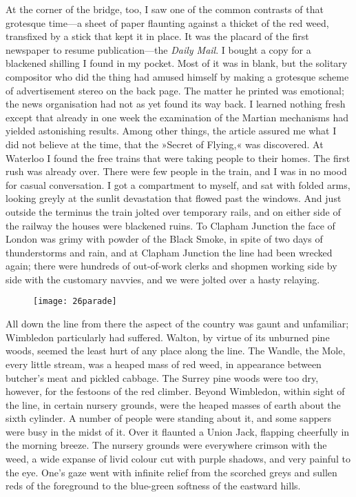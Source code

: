 At the corner of the bridge, too, I saw one of the common contrasts of that grotesque time—a sheet of paper flaunting against a thicket of the red weed, transfixed by a stick that kept it in place. It was the placard of the first newspaper to resume publication—the \textit{Daily Mail}. I bought a copy for a blackened shilling I found in my pocket. Most of it was in blank, but the solitary compositor who did the thing had amused himself by making a grotesque scheme of advertisement stereo on the back page. The matter he printed was emotional; the news organisation had not as yet found its way back. I learned nothing fresh except that already in one week the examination of the Martian mechanisms had yielded astonishing results. Among other things, the article assured me what I did not believe at the time, that the »Secret of Flying,« was discovered. At Waterloo I found the free trains that were taking people to their homes. The first rush was already over. There were few people in the train, and I was in no mood for casual conversation. I got a compartment to myself, and sat with folded arms, looking greyly at the sunlit devastation that flowed past the windows. And just outside the terminus the train jolted over temporary rails, and on either side of the railway the houses were blackened ruins. To Clapham Junction the face of London was grimy with powder of the Black Smoke, in spite of two days of thunderstorms and rain, and at Clapham Junction the line had been wrecked again; there were hundreds of out-of-work clerks and shopmen working side by side with the customary navvies, and we were jolted over a hasty relaying.

\begin{figure}[tb]
\centering
\texttt{[image: 26parade]}
\end{figure}



All down the line from there the aspect of the country was gaunt and unfamiliar; Wimbledon particularly had suffered. Walton, by virtue of its unburned pine woods, seemed the least hurt of any place along the line. The Wandle, the Mole, every little stream, was a heaped mass of red weed, in appearance between butcher's meat and pickled cabbage. The Surrey pine woods were too dry, however, for the festoons of the red climber. Beyond Wimbledon, within sight of the line, in certain nursery grounds, were the heaped masses of earth about the sixth cylinder. A number of people were standing about it, and some sappers were busy in the midst of it. Over it flaunted a Union Jack, flapping cheerfully in the morning breeze. The nursery grounds were everywhere crimson with the weed, a wide expanse of livid colour cut with purple shadows, and very painful to the eye. One's gaze went with infinite relief from the scorched greys and sullen reds of the foreground to the blue-green softness of the eastward hills.

